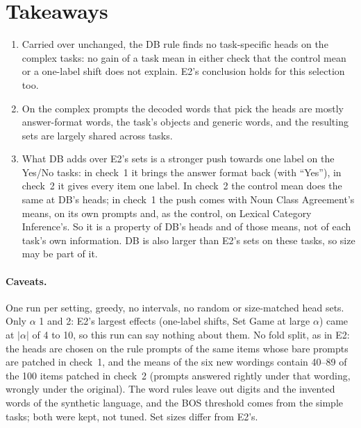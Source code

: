 \documentclass[10pt,a4paper]{article}
\begin{document}
\begin{table}[H]\centering\small

\caption{Check 2: items right under a task mean (mean over the seven wordings), under the control mean, and under both (mean over wordings), out of 100.}
\label{tab:overlap}
\end{table}

\section{Takeaways}

\begin{enumerate}
\item Carried over unchanged, the DB rule finds no task-specific heads on the complex tasks: no gain of a task mean in either check that the control mean or a one-label shift does not explain. E2's conclusion holds for this selection too.
\item On the complex prompts the decoded words that pick the heads are mostly answer-format words, the task's objects and generic words, and the resulting sets are largely shared across tasks.
\item What DB adds over E2's sets is a stronger push towards one label on the Yes/No tasks: in check~1 it brings the answer format back (with ``Yes''), in check~2 it gives every item one label. In check~2 the control mean does the same at DB's heads; in check~1 the push comes with Noun Class Agreement's means, on its own prompts and, as the control, on Lexical Category Inference's. So it is a property of DB's heads and of those means, not of each task's own information. DB is also larger than E2's sets on these tasks, so size may be part of it.
\end{enumerate}

\paragraph{Caveats.} One run per setting, greedy, no intervals, no random or size-matched head sets. Only $\alpha$ 1 and 2: E2's largest effects (one-label shifts, Set Game at large $\alpha$) came at $|\alpha|$ of 4 to 10, so this run can say nothing about them. No fold split, as in E2: the heads are chosen on the rule prompts of the same items whose bare prompts are patched in check~1, and the means of the six new wordings contain 40--89 of the 100 items patched in check~2 (prompts answered rightly under that wording, wrongly under the original). The word rules leave out digits and the invented words of the synthetic language, and the BOS threshold comes from the simple tasks; both were kept, not tuned. Set sizes differ from E2's.
\end{document}

